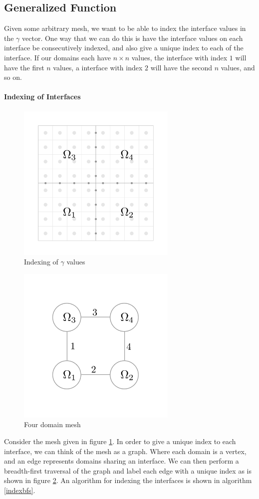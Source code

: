 \documentclass[12pt]{article}
\begin{document}
\subsection{Generalized Function}
Given some arbitrary mesh, we want to be able to index the interface values in the $\gamma$ vector.
One way that we can do this is have the interface values on each interface be consecutively indexed,
and also give a unique index to each of the interface. If our domains each have $n \times n$ values,
the interface with index $1$ will have the first $n$ values, a interface with index $2$ will have
the second $n$ values, and so on.

\paragraph{Indexing of Interfaces}
\begin{figure}[H]
    \centering
    \includegraphics[width=3in]{images/4domain.pdf}
    \caption{Indexing of $\gamma$ values}
    \label{fourdomain}
\end{figure}
\begin{figure}[H]
    \centering
    \includegraphics[width=3in]{images/4domaingraph.pdf}
    \caption{Four domain mesh}
    \label{fourgraph}
\end{figure}
Consider the mesh given in figure \ref{fourdomain}. In order to give a unique index to each
interface, we can think of the mesh as a graph. Where each domain is a vertex, and an edge 
represents
domains sharing an interface. We can then perform a breadth-first traversal of the graph and label
each edge with a unique index as is shown in figure \ref{fourgraph}. An algorithm for indexing the
interfaces is shown in algorithm \ref{indexbfs}. 
\end{document}
